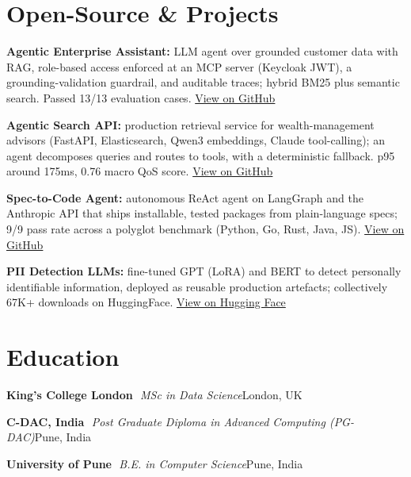 \documentclass[10pt,a4paper]{article}
\newcommand{\sep}{\,\textcolor{accent!60}{\textbar}\,}
\begin{document}
\section{Open-Source \& Projects}
\begin{tight}
  \item \textbf{Agentic Enterprise Assistant:} LLM agent over grounded customer data with RAG, role-based access enforced at an MCP server (Keycloak JWT), a grounding-validation guardrail, and auditable traces; hybrid BM25 plus semantic search. Passed 13/13 evaluation cases. \href{https://github.com/abhijeetscode/Agentic-Enterprise-Assistant}{View on GitHub}
  \item \textbf{Agentic Search API:} production retrieval service for wealth-management advisors (FastAPI, Elasticsearch, Qwen3 embeddings, Claude tool-calling); an agent decomposes queries and routes to tools, with a deterministic fallback. p95 around 175ms, 0.76 macro QoS score. \href{https://github.com/abhijeetscode/search-agent}{View on GitHub}
  \item \textbf{Spec-to-Code Agent:} autonomous ReAct agent on LangGraph and the Anthropic API that ships installable, tested packages from plain-language specs; 9/9 pass rate across a polyglot benchmark (Python, Go, Rust, Java, JS). \href{https://github.com/abhijeetscode/Spec-to-Code-Agent}{View on GitHub}
  \item \textbf{PII Detection LLMs:} fine-tuned GPT (LoRA) and BERT to detect personally identifiable information, deployed as reusable production artefacts; collectively 67K+ downloads on HuggingFace. \href{https://huggingface.co/ab-ai/pii_model}{View on Hugging Face}
\end{tight}

\section{Education}
{\color{company}\bfseries King's College London} \sep {\itshape MSc in Data Science}\hfill {\color{muted}London, UK}\par\vspace{1pt}
{\color{company}\bfseries C-DAC, India} \sep {\itshape Post Graduate Diploma in Advanced Computing (PG-DAC)}\hfill {\color{muted}Pune, India}\par\vspace{1pt}
{\color{company}\bfseries University of Pune} \sep {\itshape B.E. in Computer Science}\hfill {\color{muted}Pune, India}\par
\end{document}
